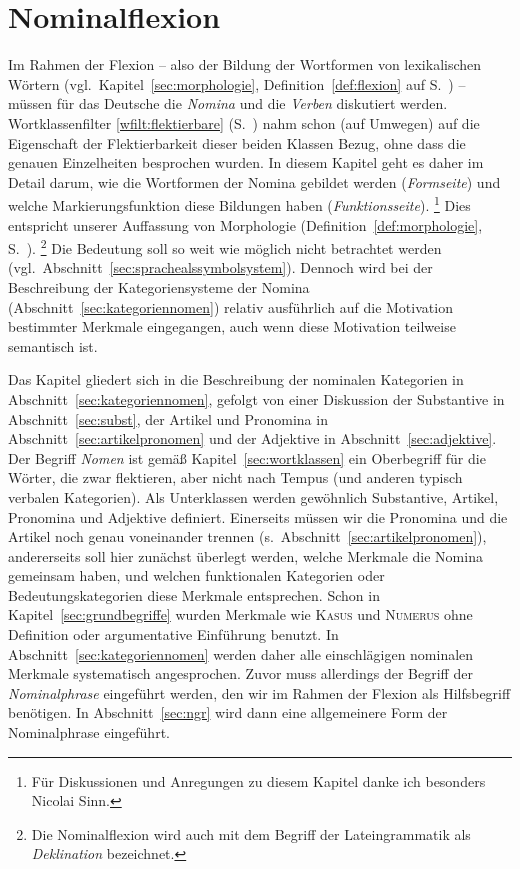 \chapter{Nominalflexion}

\label{sec:nominalflexion}

Im Rahmen der Flexion -- also der Bildung der Wortformen von lexikalischen Wörtern (vgl.\ Kapitel~\ref{sec:morphologie}, Definition~\ref{def:flexion} auf S.~\pageref{def:flexion}) -- müssen für das Deutsche die \textit{Nomina} und die \textit{Verben} diskutiert werden.
Wortklassenfilter \ref{wfilt:flektierbare} (S.~\pageref{wfilt:flektierbare}) nahm schon (auf Umwegen) auf die Eigenschaft der Flektierbarkeit dieser beiden Klassen Bezug, ohne dass die genauen Einzelheiten besprochen wurden.
In diesem Kapitel geht es daher im Detail darum, wie die Wortformen der Nomina gebildet werden (\textit{Formseite}) und welche Markierungsfunktion diese Bildungen haben (\textit{Funktionsseite}).%
\footnote{Für Diskussionen und Anregungen zu diesem Kapitel danke ich besonders Nicolai Sinn.}
Dies entspricht unserer Auffassung von Morphologie (Definition~\ref{def:morphologie}, S.~\pageref{def:morphologie}).%
\footnote{Die Nominalflexion wird auch mit dem Begriff der Lateingrammatik als \textit{Deklination} bezeichnet.}
Die Bedeutung soll so weit wie möglich nicht betrachtet werden (vgl.\ Abschnitt~\ref{sec:sprachealssymbolsystem}).
Dennoch wird bei der Beschreibung der Kategoriensysteme der Nomina (Abschnitt~\ref{sec:kategoriennomen}) relativ ausführlich auf die Motivation bestimmter Merkmale eingegangen, auch wenn diese Motivation teilweise semantisch ist.

Das Kapitel gliedert sich in die Beschreibung der nominalen Kategorien in Abschnitt~\ref{sec:kategoriennomen}, gefolgt von einer Diskussion der Substantive in Abschnitt~\ref{sec:subst}, der Artikel und Pronomina in Abschnitt~\ref{sec:artikelpronomen} und der Adjektive in Abschnitt~\ref{sec:adjektive}.
Der Begriff \textit{Nomen} ist gemäß Kapitel~\ref{sec:wortklassen} ein Oberbegriff für die Wörter, die zwar flektieren, aber nicht nach Tempus (und anderen typisch verbalen Kategorien).
Als Unterklassen werden gewöhnlich Substantive, Artikel, Pronomina und Adjektive definiert.
Einerseits müssen wir die Pronomina und die Artikel noch genau voneinander trennen (s.\ Abschnitt~\ref{sec:artikelpronomen}), andererseits soll hier zunächst überlegt werden, welche Merkmale die Nomina gemeinsam haben, und welchen funktionalen Kategorien oder Bedeutungskategorien diese Merkmale entsprechen.
Schon in Kapitel~\ref{sec:grundbegriffe} wurden Merkmale wie \textsc{Kasus} und \textsc{Numerus} ohne Definition oder argumentative Einführung benutzt.
In Abschnitt~\ref{sec:kategoriennomen} werden daher alle einschlägigen nominalen Merkmale systematisch angesprochen.
Zuvor muss allerdings der Begriff der \textit{Nominalphrase} eingeführt werden, den wir im Rahmen der Flexion als Hilfsbegriff benötigen.
In Abschnitt~\ref{sec:ngr} wird dann eine allgemeinere Form der Nominalphrase eingeführt.

